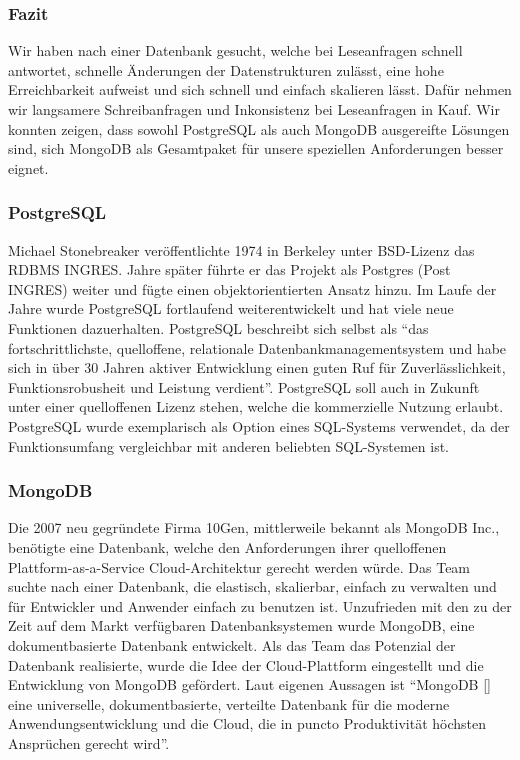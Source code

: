 \subsubsection{Fazit}
Wir haben nach einer Datenbank gesucht, welche bei Leseanfragen schnell antwortet, schnelle Änderungen der Datenstrukturen zulässt, eine hohe Erreichbarkeit aufweist und sich schnell und einfach skalieren lässt. Dafür nehmen wir langsamere Schreibanfragen und Inkonsistenz bei Leseanfragen in Kauf. Wir konnten zeigen, dass sowohl PostgreSQL als auch MongoDB ausgereifte Lösungen sind, sich MongoDB als Gesamtpaket für unsere speziellen Anforderungen besser eignet.

\subsubsection{PostgreSQL}
Michael Stonebreaker veröffentlichte 1974 in Berkeley unter BSD-Lizenz das RDBMS INGRES. Jahre später führte er das Projekt als Postgres (Post INGRES) weiter und fügte einen objektorientierten Ansatz hinzu. \cite{PG1} Im Laufe der Jahre wurde PostgreSQL fortlaufend weiterentwickelt und hat viele neue Funktionen dazuerhalten.
PostgreSQL beschreibt sich selbst als \enquote{das fortschrittlichste, quelloffene, relationale Datenbankmanagementsystem und habe sich in über 30 Jahren aktiver Entwicklung einen guten Ruf für Zuverlässlichkeit, Funktionsrobusheit und Leistung verdient}. \cite{PG2} PostgreSQL soll auch in Zukunft unter einer quelloffenen Lizenz stehen, welche die kommerzielle Nutzung erlaubt. \cite{PG3}
PostgreSQL wurde exemplarisch als Option eines SQL-Systems verwendet, da der Funktionsumfang vergleichbar mit anderen beliebten SQL-Systemen ist. \cite{PG4}

\subsubsection{MongoDB}
Die 2007 neu gegründete Firma 10Gen, mittlerweile bekannt als MongoDB Inc., benötigte eine Datenbank, welche den Anforderungen ihrer quelloffenen Plattform-as-a-Service Cloud-Architektur gerecht werden würde. Das Team suchte nach einer Datenbank, die elastisch, skalierbar, einfach zu verwalten und für Entwickler und Anwender einfach zu benutzen ist. Unzufrieden mit den zu der Zeit auf dem Markt verfügbaren Datenbanksystemen wurde MongoDB, eine dokumentbasierte Datenbank entwickelt. Als das Team das Potenzial der Datenbank realisierte, wurde die Idee der Cloud-Plattform eingestellt und die Entwicklung von MongoDB gefördert.\cite{MG1}
Laut eigenen Aussagen ist \enquote{MongoDB [] eine universelle, dokumentbasierte, verteilte Datenbank für die moderne Anwendungsentwicklung und die Cloud, die in puncto Produktivität höchsten Ansprüchen gerecht wird}. \cite{MG2} 

